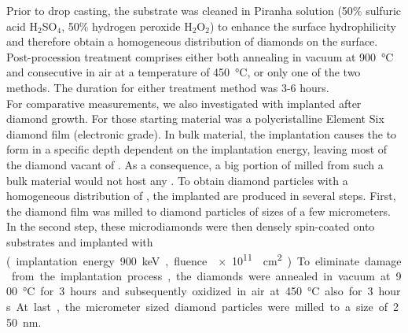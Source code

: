 	Prior to drop casting, the substrate was cleaned in Piranha solution (50\% sulfuric acid H$_2$SO$_4$, 50\% hydrogen peroxide H$_2$O$_2$) to enhance the surface hydrophilicity and therefore obtain a homogeneous distribution of diamonds on the surface.
	Post-procession treatment comprises either both annealing in vacuum at \SI{900}{\degreeCelsius} and consecutive \ox in air at a temperature of \SI{450}{\degreeCelsius}, or only one of the two methods.
	The duration for either treatment method was 3-6 hours.
	\\
	For comparative measurements, we also investigated \nds with \sivs implanted after diamond growth. 
	For those \nds starting material was a polycristalline Element Six diamond film (electronic grade).
	In bulk material, the implantation causes the \sivs to form in a specific depth dependent on the implantation energy, leaving most of the diamond vacant of \sivs.
	As a consequence, a big portion of  \nds milled from such a bulk material would not host any \sivs.
	To obtain diamond particles with a homogeneous distribution of \sivs, the implanted \nds are produced in several steps. 
	First, the diamond film was milled to diamond particles of sizes of a few micrometers.
	In the second step, these microdiamonds were then densely spin-coated onto \ir substrates and implanted with \si (implantation energy \SI{900}{keV}, fluence \SI{e11}{\per\centi\meter\squared}).
	To eliminate damage from the implantation process, the diamonds were annealed in vacuum at \SI{900}{\degreeCelsius} for 3 hours and subsequently oxidized in air at \SI{450}{\degreeCelsius} also for 3 hours.
	At last, the micrometer sized diamond particles were milled to a size of \SI{250}{\nano\meter}.


